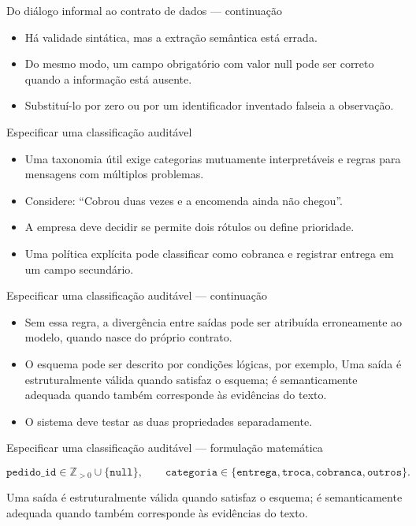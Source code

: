 \documentclass[10pt,aspectratio=169]{beamer}
\begin{document}
\begin{frame}[t]{Do diálogo informal ao contrato de dados — continuação}
\small
\begin{itemize}
\item Há validade sintática, mas a extração semântica está errada.
\item Do mesmo modo, um campo obrigatório com valor null pode ser correto quando a informação está ausente.
\item Substituí-lo por zero ou por um identificador inventado falseia a observação.
\end{itemize}
\end{frame}

\begin{frame}[t]{Especificar uma classificação auditável}
\small
\begin{itemize}
\item Uma taxonomia útil exige categorias mutuamente interpretáveis e regras para mensagens com múltiplos problemas.
\item Considere: ``Cobrou duas vezes e a encomenda ainda não chegou''.
\item A empresa deve decidir se permite dois rótulos ou define prioridade.
\item Uma política explícita pode classificar como cobranca e registrar entrega em um campo secundário.
\end{itemize}
\end{frame}

\begin{frame}[t]{Especificar uma classificação auditável — continuação}
\small
\begin{itemize}
\item Sem essa regra, a divergência entre saídas pode ser atribuída erroneamente ao modelo, quando nasce do próprio contrato.
\item O esquema pode ser descrito por condições lógicas, por exemplo, Uma saída é estruturalmente válida quando satisfaz o esquema; é semanticamente adequada quando também corresponde às evidências do texto.
\item O sistema deve testar as duas propriedades separadamente.
\end{itemize}
\end{frame}

\begin{frame}[t]{Especificar uma classificação auditável — formulação matemática}
\small
\vspace{3mm}\begin{center}\small\[\texttt{pedido\_id}\in\mathbb Z_{>0}\cup\{\texttt{null}\},\qquad
\texttt{categoria}\in\{\texttt{entrega},\texttt{troca},\texttt{cobranca},\texttt{outros}\}.\]\end{center}
\vspace{3mm}\small Uma saída é estruturalmente válida quando satisfaz o esquema; é semanticamente adequada quando também corresponde às evidências do texto.
\end{frame}
\end{document}
